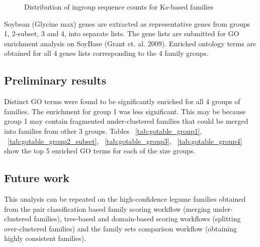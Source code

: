 \documentclass{article}
\begin{document}
		\begin{figure}[h!]
			\caption{Distribution of ingroup sequence counts for Ks-based families}
			\label{fig:hist_lgf5_family_size_groups}
		\end{figure}
	
		Soybean (Glycine max) genes are extracted as representative genes from groups 1, 2-subset, 3 and 4, into separate lists. The gene lists are submitted for GO enrichment analysis on SoyBase (Grant et. al. 2009). Enriched ontology terms are obtained for all 4 genes lists corresponding to the 4 family groups.
		
		\subsection{Preliminary results}
		Distinct GO terms were found to be significantly enriched for all 4 groups of families. The enrichment for group 1 was less significant. This may be because group 1 may contain fragmented under-clustered families that could be merged into families from other 3 groups. Tables ~\ref{tab:gotable_group1}, ~\ref{tab:gotable_group2_subset}, ~\ref{tab:gotable_group3}, ~\ref{tab:gotable_group4} show the top 5 enriched GO terms for each of the size groups.
		
		\subsection{Future work}
		This analysis can be repeated on the high-confidence legume families obtained from the pair classification based family scoring workflow (merging under-clustered families), tree-based and domain-based scoring workflows (splitting over-clustered families) and the family sets comparison workflow (obtaining highly consistent families). 
		
\end{document}
